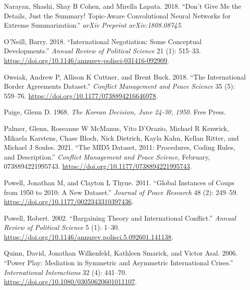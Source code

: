 \documentclass{article}
\newlength{\cslhangindent}
\newlength{\cslentryspacingunit} %
\newenvironment{CSLReferences}[2] %
 {%
  \setlength{\parindent}{0pt}
  \ifodd #1
  \let\oldpar\par
  \def\par{\hangindent=\cslhangindent\oldpar}
  \fi
  \setlength{\parskip}{#2\cslentryspacingunit}
 }%
 {}
\begin{document}
\begin{CSLReferences}{1}{0}
\leavevmode{}%
Narayan, Shashi, Shay B Cohen, and Mirella Lapata. 2018. {``Don't Give
Me the Details, Just the Summary! Topic-Aware Convolutional Neural
Networks for Extreme Summarization.''} \emph{arXiv Preprint
arXiv:1808.08745}.

\leavevmode{}%
O'Neill, Barry. 2018. {``International {Negotiation}: {Some Conceptual
Developments}.''} \emph{Annual Review of Political Science} 21 (1):
515--33. \url{https://doi.org/10.1146/annurev-polisci-031416-092909}.

\leavevmode{}%
Owsiak, Andrew P, Allison K Cuttner, and Brent Buck. 2018. {``The
{International Border Agreements Dataset}.''} \emph{Conflict Management
and Peace Science} 35 (5): 559--76.
\url{https://doi.org/10.1177/0738894216646978}.

\leavevmode{}%
Paige, Glenn D. 1968. \emph{The {Korean Decision}, {June} 24-30, 1950}.
{Free Press}.

\leavevmode{}%
Palmer, Glenn, Roseanne W McManus, Vito D'Orazio, Michael R Kenwick,
Mikaela Karstens, Chase Bloch, Nick Dietrich, Kayla Kahn, Kellan Ritter,
and Michael J Soules. 2021. {``The {MID5 Dataset}, 2011:
{Procedures}, Coding Rules, and Description.''} \emph{Conflict
Management and Peace Science}, February, 0738894221995743.
\url{https://doi.org/10.1177/0738894221995743}.

\leavevmode{}%
Powell, Jonathan M, and Clayton L Thyne. 2011. {``Global Instances of
Coups from 1950 to 2010: {A} New Dataset.''} \emph{Journal of Peace
Research} 48 (2): 249--59.
\url{https://doi.org/10.1177/0022343310397436}.

\leavevmode{}%
Powell, Robert. 2002. {``Bargaining {Theory} and {International
Conflict}.''} \emph{Annual Review of Political Science} 5 (1): 1--30.
\url{https://doi.org/10.1146/annurev.polisci.5.092601.141138}.

\leavevmode{}%
Quinn, David, Jonathan Wilkenfeld, Kathleen Smarick, and Victor Asal.
2006. {``Power {Play}: {Mediation} in {Symmetric} and {Asymmetric
International Crises}.''} \emph{International Interactions} 32 (4):
441--70. \url{https://doi.org/10.1080/03050620601011107}.


\end{CSLReferences}
\end{document}
